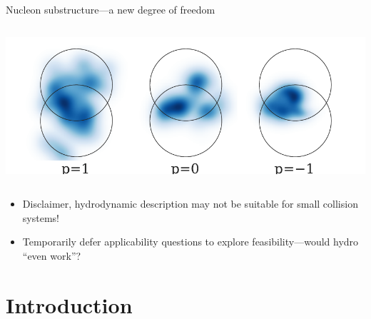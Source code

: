 \documentclass{beamer}
\begin{document}
\begin{frame}[plain]{Nucleon substructure---a new degree of freedom}
\begin{columns}
\begin{column}{.95\textwidth}
\begin{flushleft}
{          \includegraphics[width=.85\columnwidth]{proton_shapes_substructure}
        }
      \end{flushleft}
    \end{column}
  \end{columns}
\end{frame}

\begin{frame}
  \begin{itemize}
    \Large
    \item[\LARGE \textcolor{pyred}{\faicon{warning}} \,] Disclaimer, hydrodynamic description may not be suitable for small collision systems!
      \bigskip
    \item[\LARGE \textcolor{pyblue}{\faicon{commenting-o}} \,] Temporarily defer applicability questions to explore feasibility---would hydro ``even work''?
  \end{itemize}
\end{frame}

\section{Introduction}
\end{document}
